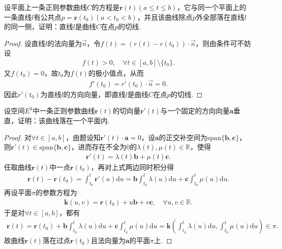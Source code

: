 \documentclass[../../main.tex]{subfiles}%
\begin{document}
\begin{example}
设平面上一条正则参数曲线$C$的方程是$\bm{r}(t)(a \leqslant t \leqslant b)$，它与同一个平面上的一条直线$l$有公共点$p = \bm{r}(t_0)(a < t_0 < b)$，并且该曲线除点$p$外全部落在直线$l$的同一侧，证明：直线$l$是曲线$C$在点$p$的切线.
\end{example}
\begin{proof}
设直线$l$的法向量为$\overrightarrow{n}$，令$f(t)=(r(t)-r(t_0))\cdot\overrightarrow{n}$，则由条件可不妨设\begin{align*}
f(t)>0,\quad \forall t\in[a,b]\setminus\{t_0\}.
\end{align*}
又$f(t_0)=0$，故$t_0$为$f(t)$的极小值点，从而
\begin{align*}
f'(t_0)=r'(t_0)\cdot\overrightarrow{n}=0.
\end{align*}
因此$r'(t_0)$为直线$l$的方向向量，即直线$l$是曲线$C$在点$p$的切线.
\end{proof}

\begin{example}
设空间$E^3$中一条正则参数曲线$\bm{r}(t)$的切向量$\bm{r}'(t)$与一个固定的方向向量$\bm{a}$垂直，证明：该曲线落在一个平面内.
\end{example}
\begin{proof}
对$\forall t\in[a,b]$，由题设知$\boldsymbol{r}'(t)\cdot\boldsymbol{a}=0$，设$\boldsymbol{a}$的正交补空间为$\mathrm{span}\{\boldsymbol{b},\boldsymbol{c}\}$，则$\boldsymbol{r}'(t)\in\mathrm{span}\{\boldsymbol{b},\boldsymbol{c}\}$，进而存在不全为0的$\lambda(t),\mu(t)\in\mathbb{R}$，使得\begin{align*}
\boldsymbol{r}'(t)=\lambda(t)\boldsymbol{b}+\mu(t)\boldsymbol{c}.
\end{align*}
任取曲线$\boldsymbol{r}(t)$中一点$\boldsymbol{r}(t_0)$，再对上式两边同时积分得\begin{align*}
\boldsymbol{r}(t)-\boldsymbol{r}(t_0)=\int_{t_0}^t\boldsymbol{r}'(u)\mathrm{d}u=\boldsymbol{b}\int_{t_0}^t\lambda(u)\mathrm{d}u+\boldsymbol{c}\int_{t_0}^t\mu(u)\mathrm{d}u.
\end{align*}
再设平面$\pi$的参数方程为\begin{align*}
\boldsymbol{k}(u,v)=\boldsymbol{r}(t_0)+u\boldsymbol{b}+v\boldsymbol{c},\quad \forall u,v\in\mathbb{R}.
\end{align*}
于是对$\forall t\in[a,b]$，都有\begin{align*}
\boldsymbol{r}(t)=\boldsymbol{r}(t_0)+\boldsymbol{b}\int_{t_0}^t\lambda(u)\mathrm{d}u+\boldsymbol{c}\int_{t_0}^t\mu(u)\mathrm{d}u=\boldsymbol{k}\left(\int_{t_0}^t\lambda(u)\mathrm{d}u,\int_{t_0}^t\mu(u)\mathrm{d}u\right)\in\pi.
\end{align*}
故曲线$\boldsymbol{r}(t)$落在过点$\boldsymbol{r}(t_0)$且法向量为$\boldsymbol{a}$的平面$\pi$上.
\end{proof}
\end{document}
